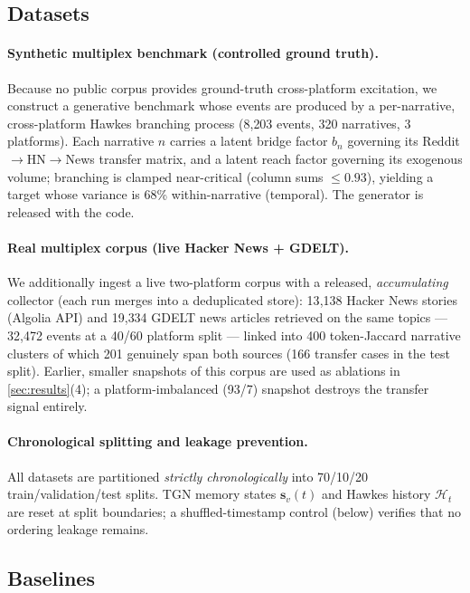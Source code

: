 \documentclass[11pt]{article}
\newcommand{\bs}{\mathbf{s}}
\newcommand{\cH}{\mathcal{H}}
\begin{document}
\subsection{Datasets}
\label{sec:gdelt}

\paragraph{Synthetic multiplex benchmark (controlled ground truth).}
Because no public corpus provides ground-truth cross-platform excitation, we
construct a generative benchmark whose events are produced by a per-narrative,
cross-platform Hawkes branching process (8{,}203 events, 320 narratives, 3
platforms). Each narrative $n$ carries a latent bridge factor $b_n$ governing
its Reddit$\to$HN$\to$News transfer matrix, and a latent reach factor governing
its exogenous volume; branching is clamped near-critical (column sums
$\le 0.93$), yielding a target whose variance is 68\% within-narrative
(temporal). The generator is released with the code.

\paragraph{Real multiplex corpus (live Hacker News + GDELT).}
We additionally ingest a live two-platform corpus with a released,
\emph{accumulating} collector (each run merges into a deduplicated store):
13{,}138 Hacker News stories (Algolia API) and 19{,}334 GDELT news articles
retrieved on the same topics --- 32{,}472 events at a 40/60 platform split ---
linked into 400 token-Jaccard narrative clusters of which 201 genuinely span
both sources (166 transfer cases in the test split). Earlier, smaller
snapshots of this corpus are used as ablations in \cref{sec:results}(4);
a platform-imbalanced (93/7) snapshot destroys the transfer signal entirely.

\paragraph{Chronological splitting and leakage prevention.}
All datasets are partitioned \emph{strictly chronologically} into 70/10/20
train/validation/test splits. TGN memory states $\bs_v(t)$ and Hawkes history
$\cH_t$ are reset at split boundaries; a shuffled-timestamp control (below)
verifies that no ordering leakage remains.

\subsection{Baselines}
\end{document}
